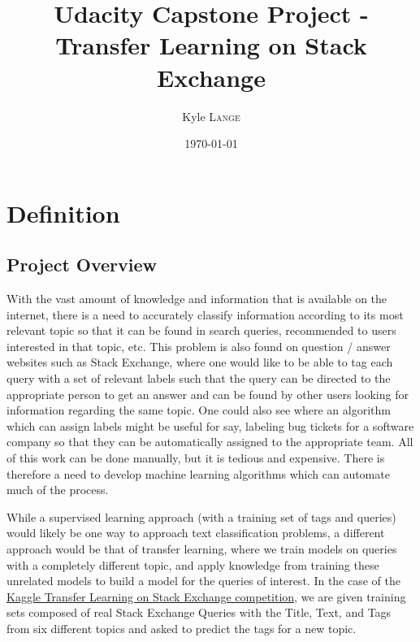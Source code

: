 \documentclass{article}
\title{Udacity Capstone Project - Transfer Learning on Stack Exchange} %
\author{Kyle \textsc{Lange}} %
\date{\today} %
\begin{document}
\maketitle %

\section{Definition}

\subsection{Project Overview}



With the vast amount of knowledge and information that is available on the
internet, there is a need to accurately classify information according to its
most relevant topic so that it can be found in search queries, recommended to
users interested in that topic, etc. This problem is also found on question /
answer websites such as Stack Exchange, where one would like to be able to tag
each query with a set of relevant labels such that the query can be directed
to the appropriate person to get an answer and can be found by other users
looking for information regarding the same topic. One could also see where an
algorithm which can assign labels might be useful for say, labeling bug
tickets for a software company so that they can be automatically assigned to
the appropriate team. All of this work can be done manually, but it is tedious
and expensive. There is therefore a need to develop machine learning algorithms
which can automate much of the process.

While a supervised learning approach (with a training set of tags and queries)
would likely be one way to approach text classification problems, a different
approach would be that of transfer learning, where we train models on queries
with a completely different topic, and apply knowledge from training these
unrelated models to build a model for the queries of interest. In the case of
the \href{https://www.kaggle.com/c/transfer-learning-on-stack-exchange-tags}{Kaggle Transfer Learning on Stack Exchange competition}, we are given training
sets composed of real Stack Exchange Queries with the Title, Text, and Tags 
from six different topics and asked to predict the tags for a new topic. 
\end{document}
